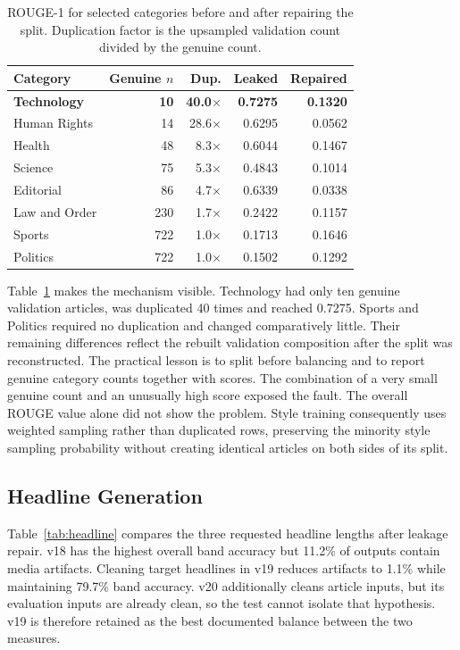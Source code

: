 \documentclass[a4paper,conference]{IEEEtran}
\begin{document}
\begin{table}[!b]
\caption{ROUGE-1 for selected categories before and after repairing the split. Duplication factor is the upsampled validation count divided by the genuine count. }
\label{tab:leak}
\centering
\footnotesize
\setlength{\tabcolsep}{3pt}
\renewcommand{\arraystretch}{1.04}
\begin{tabular}{|l|r|r|r|r|}
\hline
\textbf{Category} & \textbf{Genuine $n$} & \textbf{Dup.} & \textbf{Leaked} & \textbf{Repaired} \\
\hline
\rowcolor{gray!10}
\textbf{Technology} & \textbf{10} & \textbf{40.0$\times$} & \textbf{0.7275} & \textbf{0.1320} \\
\hline
Human Rights  & 14  & 28.6$\times$ & 0.6295 & 0.0562 \\
\hline
Health        & 48  & 8.3$\times$  & 0.6044 & 0.1467 \\
\hline
Science       & 75  & 5.3$\times$  & 0.4843 & 0.1014 \\
\hline
Editorial     & 86  & 4.7$\times$  & 0.6339 & 0.0338 \\
\hline
Law and Order & 230 & 1.7$\times$  & 0.2422 & 0.1157 \\
\hline
Sports        & 722 & 1.0$\times$  & 0.1713 & 0.1646 \\
\hline
Politics      & 722 & 1.0$\times$  & 0.1502 & 0.1292 \\
\hline
\end{tabular}
\end{table}

Table~\ref{tab:leak} makes the mechanism visible. Technology had only ten
genuine validation articles, was duplicated 40 times and reached 0.7275.
Sports and Politics required no duplication and changed comparatively little. Their remaining differences reflect the rebuilt validation composition after the split was reconstructed.
The practical lesson is to split before balancing and to report genuine
category counts together with scores. The combination of a very small genuine count
and an unusually high score exposed the fault.
The overall ROUGE value alone did not show the problem. Style training consequently uses weighted
sampling rather than duplicated rows, preserving the minority style sampling
probability without creating identical articles on both sides of its split.

\subsection{Headline Generation}
Table~\ref{tab:headline} compares the three requested headline lengths after
leakage repair. v18 has the highest overall band accuracy but 11.2\% of outputs
contain media artifacts. Cleaning target headlines in v19 reduces artifacts to
1.1\% while maintaining 79.7\% band accuracy. v20 additionally cleans article
inputs, but its evaluation inputs are already clean, so the test cannot isolate
that hypothesis. v19 is therefore retained as the best documented balance between the two measures.
\end{document}

